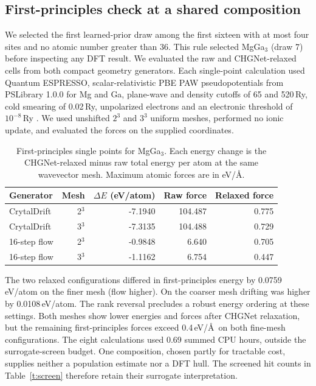 \subsection{First-principles check at a shared composition}
We selected the first learned-prior draw among the first sixteen with at most four sites and no atomic number greater than 36. This rule selected MgGa$_3$ (draw 7) before inspecting any DFT result. We evaluated the raw and CHGNet-relaxed cells from both compact geometry generators. Each single-point calculation used Quantum ESPRESSO, scalar-relativistic PBE PAW pseudopotentials from PSLibrary 1.0.0 for Mg and Ga, plane-wave and density cutoffs of 65 and 520\,Ry, cold smearing of 0.02\,Ry, unpolarized electrons and an electronic threshold of $10^{-8}$\,Ry \cite{qe,pslibrary}. We used unshifted $2^3$ and $3^3$ uniform meshes, performed no ionic update, and evaluated the forces on the supplied coordinates.
\begin{table}[!htbp]\centering\small
\caption{First-principles single points for MgGa$_3$. Each energy change is the CHGNet-relaxed minus raw total energy per atom at the same wavevector mesh. Maximum atomic forces are in eV/\AA.}\label{t:dft}
\begin{tabular}{lrrrr}\hline Generator & Mesh & $\Delta E$ (eV/atom) & Raw force & Relaxed force\\\hline
CrytalDrift & 2$^3$ & -7.1940 & 104.487 & 0.775\\
CrytalDrift & 3$^3$ & -7.3135 & 104.488 & 0.729\\
16-step flow & 2$^3$ & -0.9848 & 6.640 & 0.705\\
16-step flow & 3$^3$ & -1.1162 & 6.754 & 0.447\\
\hline\end{tabular}\end{table}
The two relaxed configurations differed in first-principles energy by 0.0759\,eV/atom on the finer mesh (flow higher). On the coarser mesh drifting was higher by 0.0108\,eV/atom. The rank reversal precludes a robust energy ordering at these settings. Both meshes show lower energies and forces after CHGNet relaxation, but the remaining first-principles forces exceed 0.4\,eV/\AA\ on both fine-mesh configurations. The eight calculations used 0.69 summed CPU hours, outside the surrogate-screen budget. One composition, chosen partly for tractable cost, supplies neither a population estimate nor a DFT hull. The screened hit counts in Table~\ref{t:screen} therefore retain their surrogate interpretation.
